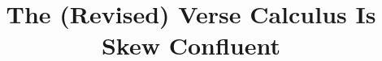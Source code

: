 \documentclass[acmsmall,review,anonymous,dvipsnames]{acmart}
\begin{document}
\title{The (Revised) Verse Calculus Is Skew Confluent}

\maketitle












\end{document}
